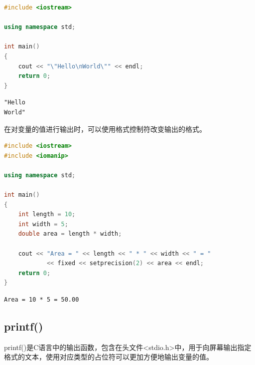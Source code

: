 
\begin{lstlisting}[language=C++]
#include <iostream>

using namespace std;

int main()
{
	cout << "\"Hello\nWorld\"" << endl;
	return 0;
}
\end{lstlisting}

\begin{tcolorbox}
	\begin{verbatim}
"Hello
World"
	\end{verbatim}
\end{tcolorbox}

在对变量的值进行输出时，可以使用格式控制符改变输出的格式。\\


\begin{lstlisting}[language=C++]
#include <iostream>
#include <iomanip>

using namespace std;

int main()
{
	int length = 10;
	int width = 5;
	double area = length * width;

	cout << "Area = " << length << " * " << width << " = "
			<< fixed << setprecision(2) << area << endl;
	return 0;
}
\end{lstlisting}

\begin{tcolorbox}
	\begin{verbatim}
Area = 10 * 5 = 50.00
	\end{verbatim}
\end{tcolorbox}

\vspace{0.5cm}

\subsection{printf()}

printf()是C语言中的输出函数，包含在头文件<stdio.h>中，用于向屏幕输出指定格式的文本，使用对应类型的占位符可以更加方便地输出变量的值。\\

\begin{table}[H]
	\centering
	\caption{占位符}
\end{table}

